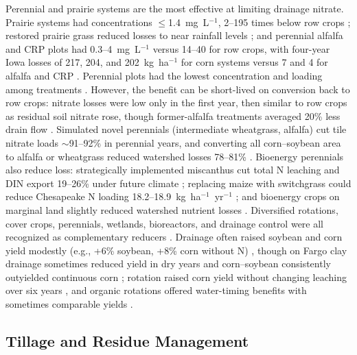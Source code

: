 Perennial and prairie systems are the most effective at limiting drainage nitrate. Prairie systems had concentrations $\le$1.4~mg~L$^{-1}$, 2--195 times below row crops \parencite{Daigh2015b}; restored prairie grass reduced losses to near rainfall levels \parencite{HernandezRamirez2011}; and perennial alfalfa and CRP plots had 0.3--4~mg~L$^{-1}$ versus 14--40 for row crops, with four-year Iowa losses of 217, 204, and 202~kg~ha$^{-1}$ for corn systems versus 7 and 4 for alfalfa and CRP \parencite{Randall2001}. Perennial plots had the lowest concentration and loading among treatments \parencite{Waring2024}. However, the benefit can be short-lived on conversion back to row crops: nitrate losses were low only in the first year, then similar to row crops as residual soil nitrate rose, though former-alfalfa treatments averaged 20\% less drain flow \parencite{Huggins2001}. Simulated novel perennials (intermediate wheatgrass, alfalfa) cut tile nitrate loads $\sim$91--92\% in perennial years, and converting all corn--soybean area to alfalfa or wheatgrass reduced watershed losses 78--81\% \parencite{Wilson2023}. Bioenergy perennials also reduce loss: strategically implemented miscanthus cut total N leaching and DIN export 19--26\% under future climate \parencite{Ferin2023}; replacing maize with switchgrass could reduce Chesapeake N loading 18.2--18.9~kg~ha$^{-1}$~yr$^{-1}$ \parencite{Woodbury2018}; and bioenergy crops on marginal land slightly reduced watershed nutrient losses \parencite{Guo2018}. Diversified rotations, cover crops, perennials, wetlands, bioreactors, and drainage control were all recognized as complementary reducers \parencite{Dinnes2002}. Drainage often raised soybean and corn yield modestly (e.g., +6\% soybean, +8\% corn without N) \parencite{Cassman2025}, though on Fargo clay drainage sometimes reduced yield in dry years and corn--soybean consistently outyielded continuous corn \parencite{Acharya2019b}; rotation raised corn yield without changing leaching over six years \parencite{Bakhsh2005}, and organic rotations offered water-timing benefits with sometimes comparable yields \parencite{Logsdon2021}.

\subsection{Tillage and Residue Management}

